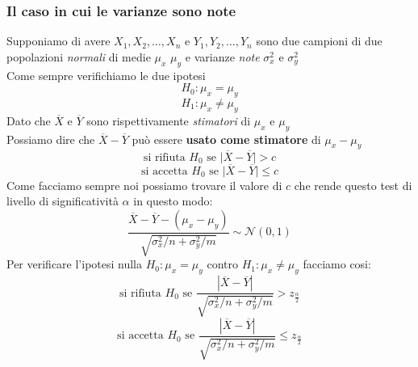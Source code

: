 \documentclass[]{article}
\begin{document}
    \subsubsection{Il caso in cui le varianze sono note}
    Supponiamo di avere $X_1, X_2, \ldots, X_n$ e $Y_1, Y_2, \ldots, Y_n$ sono due campioni di due popolazioni \textit{normali} di medie $\mu_x$ $\mu_y$ e varianze \textit{note} $\sigma^2_x$ e $\sigma^2_y$ \\
    Come sempre verifichiamo le due ipotesi
    \[ H_0 : \mu_x = \mu_y \]
    \[ H_1 : \mu_x \not = \mu_y \]
    Dato che $\overline{X}$ e $\overline{Y}$ sono rispettivamente \textit{stimatori} di $\mu_x$ e $\mu_y$ \\
    Possiamo dire che $\overline{X} - \overline{Y}$ può essere \textbf{usato come stimatore} di $\mu_x - \mu_y$
    \[ \text{si rifiuta } H_0 \text{ se } \big|\overline{X} - \overline{Y} \big| > c \]
    \[ \text{si accetta } H_0 \text{ se } \big|\overline{X} - \overline{Y} \big| \leq c \]
    Come facciamo sempre noi possiamo trovare il valore di $c$ che rende questo test di livello di significatività $\alpha$ in questo modo:
    \[ \frac{\overline{X} - \overline{Y} - (\mu_x - \mu_y)}{\sqrt{\sigma^2_x / n + \sigma^2_y / m}} \sim \mathcal{N}(0,1) \]
    Per verificare l'ipotesi nulla $H_0 : \mu_x = \mu_y$ contro $H_1 : \mu_x \not = \mu_y$ facciamo cosi:
    \[ \text{si rifiuta } H_0 \text{ se } \frac{|\overline{X} - \overline{Y}|}{\sqrt{\sigma^2_x / n + \sigma^2_y / m}} > z_{\frac{\alpha}{2}} \]
    \[ \text{si accetta } H_0 \text{ se } \frac{|\overline{X} - \overline{Y}|}{\sqrt{\sigma^2_x / n + \sigma^2_y / m}} \leq z_{\frac{\alpha}{2}} \]
\end{document}
